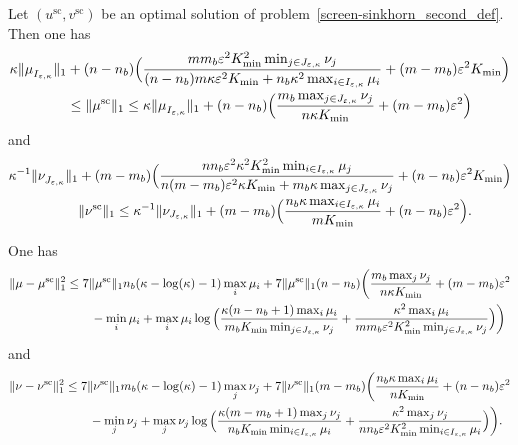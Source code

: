 \begin{lemma}
\label{lemma_bounds_on_marginals}
Let $(u^{\text{sc}}, v^{\text{sc}})$ be an optimal solution of problem~\eqref{screen-sinkhorn_second_def}.
Then one has 
\begin{align*}
 \kappa \|\mu_{I_{\varepsilon,\kappa}}^{\text{}}\|_1 & + (n -n_b) \Big(\frac{mm_b\varepsilon^2 K_{\min}^2 \min_{j\in J_{\varepsilon, \kappa}} \nu_j}{ (n-n_b)m\kappa \varepsilon^2 K_{\min} + n_b\kappa^2 \max_{i\in I_{\varepsilon,\kappa}}\mu_i } + (m-m_b)\varepsilon^2K_{\min}\Big)\\
 & \leq \|\mu^{\text{sc}}\|_1  \leq \kappa \|\mu_{I_{\varepsilon,\kappa}}^{\text{}}\|_1 + (n-n_b) \Big(\frac{m_b\max_{j \in J_{\varepsilon,\kappa}} \nu_j}{n\kappa K_{\min}} + (m-m_b)\varepsilon^2 \Big)
\end{align*}
and 
\begin{align*}
\kappa^{-1} \|\nu_{J_{\varepsilon,\kappa}}^{\text{}}\|_1 & + (m -m_b) \Big(\frac{nn_b\varepsilon^2\kappa^2K_{\min}^2 \min_{i\in I_{\varepsilon, \kappa}} \mu_j}{ n(m-m_b)\varepsilon^2 \kappa K_{\min} + m_b\kappa \max_{j\in J_{\varepsilon,\kappa}}\nu_j } + (n-n_b)\varepsilon^2K_{\min}\Big)\\
&\|\nu^{\text{sc}}\|_1 \leq \kappa^{-1} \|\nu_{J_{\varepsilon,\kappa}}\|_1 + (m-m_b)\Big(\frac{n_b\kappa \max_{i\in I_{\varepsilon,\kappa}}\mu_i}{m K_{\min}} + (n-n_b)\varepsilon^2\Big).
\end{align*}

\end{lemma}
\begin{proposition}
\label{proposition_error_in_marginals}
One has 
\begin{align*}
{\|{\mu} -{\mu}^{\text{sc}}\|^2_1}&\leq 7\|\mu^{\text{sc}}\|_1 n_b(\kappa-\log(\kappa)-1)\max_{i} \mu_i + 7\|\mu^{\text{sc}}\|_1  (n-n_b)\bigg(\frac{m_b\max_{j}\nu_j}{n\kappa K_{\min}} + (m- m_b) \varepsilon^2\\
&\qquad - \min_{i}\mu_i + \max_{i} \mu_i\log\Big(\frac{\kappa(n-n_b+ 1)\max_{i} \mu_i}{m_b K_{\min}\min_{j \in J_{\varepsilon,\kappa}}\nu_j} + \frac{\kappa^2\max_{i} \mu_i}{mm_b\varepsilon^2K_{\min}^2\min_{j \in J_{\varepsilon,\kappa}}\nu_j}\Big)\bigg)
\end{align*}
and 
\begin{align*}
{\|{\nu} -{\nu}^{\text{sc}}\|^2_1} &\leq 7\|\nu^{\text{sc}}\|_1m_b(\kappa-\log(\kappa)-1)\max_{j} \nu_j + 7\|\nu^{\text{sc}}\|_1(m-m_b)\bigg(\frac{n_b\kappa\max_{i}\mu_i}{n K_{\min}} + (n- n_b) \varepsilon^2\\ 
&\qquad - \min_{j}\nu_j + \max_{j} \nu_j\log\Big(\frac{\kappa(m-m_b+ 1)\max_{j} \nu_j}{n_b K_{\min}\min_{i \in I_{\varepsilon,\kappa}}\mu_i} + \frac{\kappa^2\max_{j} \nu_j}{nn_b\varepsilon^2K_{\min}^2\min_{i \in I_{\varepsilon,\kappa}}\mu_i}\Big)\bigg).
\end{align*}
\end{proposition}
